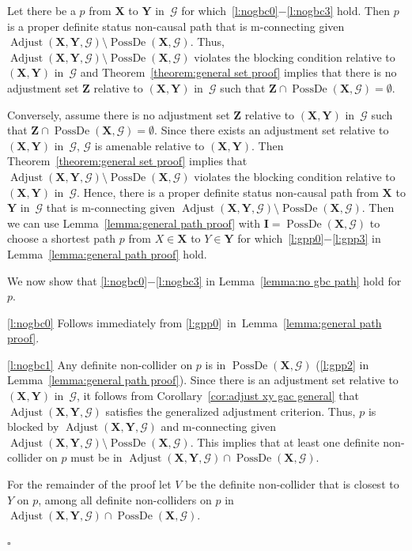 \documentclass[11pt,a4paper]{article}
\newenvironment{proofof}[1][]{\begin{trivlist}
   \item[\hskip \labelsep {\bfseries Proof of #1.}]}{\hfill{}$\square$\end{trivlist}}
\DeclareMathOperator{\PossDe}{PossDe}
\DeclareMathOperator{\Adjust}{Adjust}
\newcommand{\blck}{the blocking condition\xspace}
\newcommand{\g}[1][G]{\mathcal{#1}}
\newcommand{\adjustb}[2][X,Y]{\Adjust(\mathbf{#1},#2)}
\begin{document}
\begin{proofof}[Lemma~\ref{lemma:no gbc path}]
Let there be a $p$ from $\mathbf{X}$ to $\mathbf{Y}$ in~$\g$ for which~\ref{l:nogbc0}$-$\ref{l:nogbc3} hold. Then $p$ is a proper definite status non-causal path that is m-connecting given $\adjustb{\g} \setminus \PossDe(\mathbf{X},\g)$. Thus, $\adjustb{\g} \setminus \PossDe(\mathbf{X},\g)$ violates \blck{} relative to $(\mathbf{X,Y})$ in~$\g$ and Theorem~\ref{theorem:general set proof} implies that there is no adjustment set $\mathbf{Z}$ relative to $(\mathbf{X,Y})$ in~$\g$ such that $\mathbf{Z} \cap \PossDe(\mathbf{X},\g) = \emptyset$.

Conversely, assume there is no adjustment set $\mathbf{Z}$ relative to $(\mathbf{X,Y})$ in~$\g$ such that $\mathbf{Z} \cap \PossDe(\mathbf{X},\g) = \emptyset$. Since there exists an adjustment set relative to $(\mathbf{X,Y})$ in~$\g$, $\g$ is amenable relative to $(\mathbf{X,Y})$. Then Theorem~\ref{theorem:general set proof} implies that $\adjustb{\g} \setminus \PossDe(\mathbf{X},\g)$ violates \blck{} relative to $(\mathbf{X,Y})$ in~$\g$.
Hence, there is a proper definite status non-causal path from $\mathbf{X}$ to $\mathbf{Y}$ in~$\g$ that is m-connecting given $\adjustb{\g} \setminus \PossDe(\mathbf{X},\g)$.
Then we can use Lemma~\ref{lemma:general path proof} with $\mathbf{I} = \PossDe(\mathbf{X},\g)$ to choose a shortest path $p$ from $X \in \mathbf{X}$ to $Y \in \mathbf{Y}$ for which~\ref{l:gpp0}$-$\ref{l:gpp3} in Lemma~\ref{lemma:general path proof} hold.

We now show that \ref{l:nogbc0}$-$\ref{l:nogbc3} in Lemma~\ref{lemma:no gbc path} hold for $p$.

\ref{l:nogbc0} Follows immediately from \ref{l:gpp0}~in~Lemma~\ref{lemma:general path proof}.

\ref{l:nogbc1} Any definite non-collider on $p$ is in $\PossDe(\mathbf{X},\g)$ (\ref{l:gpp2} in Lemma~\ref{lemma:general path proof}).
Since there is an adjustment set relative to $(\mathbf{X,Y})$ in~$\g$, it follows from Corollary~\ref{cor:adjust xy gac general} that $\adjustb{\g}$ satisfies the generalized adjustment criterion. Thus, $p$ is blocked by $\adjustb{\g}$ and m-connecting given $\adjustb{\g} \setminus\PossDe(\mathbf{X},\g)$. This implies that at least one definite non-collider on $p$ must be in $\adjustb{\g}\cap \PossDe(\mathbf{X},\g)$.

For the remainder of the proof let $V$ be the definite non-collider that is closest to $Y$ on $p$, among all definite non-colliders on $p$ in $ \adjustb{\g} \cap \PossDe(\mathbf{X},\g)$.


\end{proofof}
\end{document}
